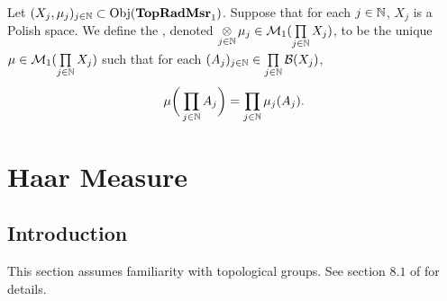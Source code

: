 \documentclass{book}
\begin{document}
\begin{defn}
	Let $(X_j, \mu_j)_{j \in \mathbb{N}} \subset \operatorname{Obj}(\operatorname*{\text{\textbf{TopRadMsr}}_{1}})$. Suppose that for each $j \in \mathbb{N}$, $X_j$ is a Polish space. We define the , denoted $\operatorname*{\otimes}\limits_{j \in \mathbb{N}} \mu_j \in \mathcal{M}_1( \prod\limits_{j \in \mathbb{N}} X_j)$, to be the unique $\mu \in \mathcal{M}_1(\prod\limits_{j \in \mathbb{N}} X_ j)$ such that for each $(A_j)_{j \in \mathbb{N}} \in \prod\limits_{j \in \mathbb{N}} \mathcal{B}(X_j)$, 
	$$\mu \bigg(\prod_{j \in \mathbb{N}} A_j \bigg) = \prod_{j \in \mathbb{N}} \mu_j(A_j).$$
\end{defn}













	
	

	
	
	
	
	
	
	
	
	
	
	
	
	
	
	
	
	
	
	
	
	
	
	
	
	
	
	
	


	
	


















	\newpage
	\chapter{Haar Measure}
	
	\section{Introduction}
	
	\begin{note}
	This section assumes familiarity with topological groups. See section $8.1$ of \cite{analysis} for details. 
	\end{note}
\end{document}
